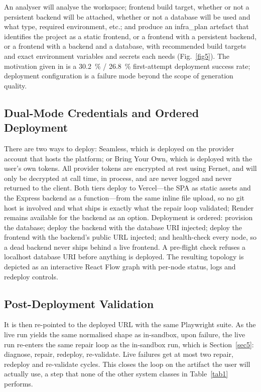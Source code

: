 \documentclass[pdflatex,sn-mathphys-num]{sn-jnl}%
\theoremstyle{thmstyleone}%
\theoremstyle{thmstyletwo}%
\theoremstyle{thmstylethree}%
\begin{document}
An analyser will analyse the workspace; frontend build target, whether or not a persistent backend will be attached, whether or not a database will be used and what type, required environment, etc.; and produce an infra\_plan artefact that identifies the project as a static frontend, or a frontend with a persistent backend, or a frontend with a backend and a database, with recommended build targets and exact environment variables and secrets each needs (Fig.~\ref{fig5}). The motivation given in \cite{r06zhang} is a 30.2~\% / 26.8~\% first-attempt deployment success rate; deployment configuration is a failure mode beyond the scope of generation quality.%

\subsection{Dual-Mode Credentials and Ordered Deployment}\label{sec6.2}

There are two ways to deploy: Seamless, which is deployed on the provider account that hosts the platform; or Bring Your Own, which is deployed with the user's own tokens. All provider tokens are encrypted at rest using Fernet, and will only be decrypted at call time, in process, and are never logged and never returned to the client. Both tiers deploy to Vercel---the SPA as static assets and the Express backend as a function---from the same inline file upload, so no git host is involved and what ships is exactly what the repair loop validated; Render remains available for the backend as an option. Deployment is ordered: provision the database; deploy the backend with the database URI injected; deploy the frontend with the backend's public URL injected; and health-check every node, so a dead backend never ships behind a live frontend. A pre-flight check refuses a localhost database URI before anything is deployed. The resulting topology is depicted as an interactive React Flow graph with per-node status, logs and redeploy controls.

\subsection{Post-Deployment Validation}\label{sec6.3}

It is then re-pointed to the deployed URL with the same Playwright suite. As the live run yields the same normalised shape as in-sandbox, upon failure, the live run re-enters the same repair loop as the in-sandbox run, which is Section~\ref{sec5}: diagnose, repair, redeploy, re-validate. Live failures get at most two repair, redeploy and re-validate cycles. This closes the loop on the artifact the user will actually use, a step that none of the other system classes in Table~\ref{tab1} performs.
\end{document}
